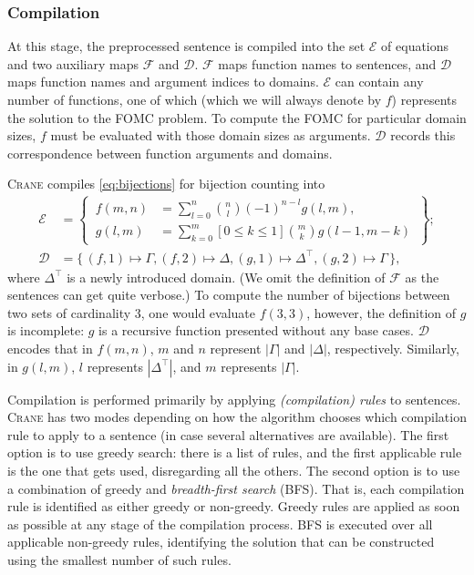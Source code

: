 \documentclass[a4paper,UKenglish,cleveref, autoref, thm-restate]{lipics-v2021}
\begin{document}
\subsubsection{Compilation}\label{sec:compilation}

At this stage, the preprocessed sentence is compiled into the set $\mathcal{E}$
of equations and two auxiliary maps $\mathcal{F}$ and $\mathcal{D}$.
$\mathcal{F}$ maps function names to sentences, and $\mathcal{D}$ maps function
names and argument indices to domains. $\mathcal{E}$ can contain any number of
functions, one of which (which we will always denote by $f$) represents the
solution to the FOMC problem. To compute the FOMC for particular domain sizes,
$f$ must be evaluated with those domain sizes as arguments. $\mathcal{D}$
records this correspondence between function arguments and domains.

\begin{example}\label{example:solution}
  \textsc{Crane} compiles \cref{eq:bijections} for bijection counting into
  \begin{align*}
    \mathcal{E} &= \left\{\,\begin{aligned}f(m, n) &= \sum_{l=0}^{n} \binom{n}{l}{(-1)}^{n-l}g(l, m),\\ g(l, m) &= \sum_{k=0}^{m}[0 \le k \le 1]\binom{m}{k}g(l-1, m-k)\end{aligned}\,\right\};\\
    \mathcal{D} &= \{\, (f, 1) \mapsto \Gamma, (f, 2) \mapsto \Delta, (g, 1) \mapsto \Delta^{\top}, (g, 2) \mapsto \Gamma \,\},
  \end{align*}
  where $\Delta^{\top}$ is a newly introduced domain. (We omit the definition of
  $\mathcal{F}$ as the sentences can get quite verbose.) To compute the number
  of bijections between two sets of cardinality 3, one would evaluate $f(3, 3)$,
  however, the definition of $g$ is incomplete: $g$ is a recursive function
  presented without any base cases. $\mathcal{D}$ encodes that in $f(m, n)$, $m$
  and $n$ represent $|\Gamma|$ and $|\Delta|$, respectively. Similarly, in
  $g(l, m)$, $l$ represents $|\Delta^{\top}|$, and $m$ represents $|\Gamma|$.
\end{example}

Compilation is performed primarily by applying \emph{(compilation) rules} to
sentences. \textsc{Crane} has two modes depending on how the algorithm chooses
which compilation rule to apply to a sentence (in case several alternatives are
available). The first option is to use greedy search: there is a list of rules,
and the first applicable rule is the one that gets used, disregarding all the
others. The second option is to use a combination of greedy and
\emph{breadth-first search} (BFS). That is, each compilation rule is identified
as either greedy or non-greedy. Greedy rules are applied as soon as possible at
any stage of the compilation process. BFS is executed over all applicable
non-greedy rules, identifying the solution that can be constructed using the
smallest number of such rules.
\end{document}
